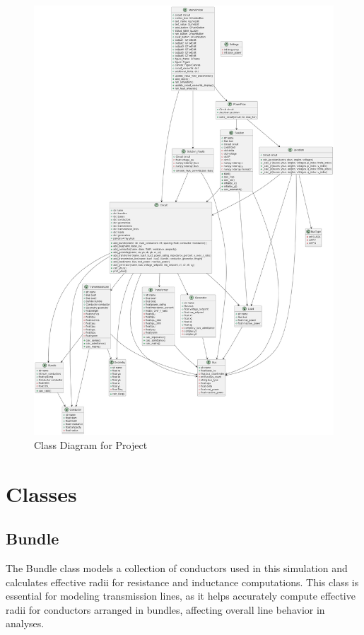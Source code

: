 \documentclass{article}
\begin{document}
	\begin{figure}[H]
		\centering
		\includegraphics[scale=0.23]{../out/circuit/circuit.png}	
		\caption{Class Diagram for Project}
	\end{figure}
	
	\section{Classes}
	
	\subsection{Bundle}
	The Bundle class models a collection of conductors used in this simulation and calculates effective radii for resistance and inductance computations. This class is essential for modeling transmission lines, as it helps accurately compute effective radii for conductors arranged in bundles, affecting overall line behavior in analyses.
	
\end{document}
